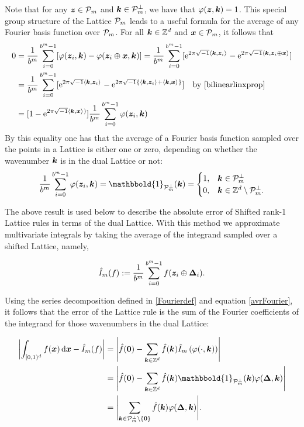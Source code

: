 \documentclass[graybox]{svmult}
\newcommand{\Z}{\mathbb{Z}} %
\newcommand{\bszero}{\boldsymbol{0}} %
\newcommand{\bsx}{\boldsymbol{x}}    %
\newcommand{\bsz}{\boldsymbol{z}}    %
\newcommand{\bsDelta}{\boldsymbol{\Delta}}    %
\newcommand{\ind}{\mathbbold{1}}
\begin{document}
Note that for any $\bsz\in\cp_m$ and $\boldsymbol{k}\in\mathcal{P}_m^\perp$, we have that $\varphi(\bsz,\bsk)=1$. This special group structure of the Lattice $\mathcal{P}_m$ leads to a useful formula for the average of any Fourier basis function over $\mathcal{P}_m$. For all $\bsk \in \Z^d$ and $\bsx \in \cp_m$, it follows that
\begin{align*}
\nonumber
0 & = \frac{1}{b^m} \sum_{i=0}^{b^m-1} [\varphi(\bsz_i,\bsk) - \varphi(\bsz_i \oplus \bsx,\bsk)]
= \frac{1}{b^m} \sum_{i=0}^{b^m-1} [\E^{2 \pi \sqrt{-1} \ip{\bsk}{\bsz_i}} - \E^{2 \pi \sqrt{-1} \ip{\bsk}{\bsz_i \oplus \bsx}}]\\
\nonumber
& = \frac{1}{b^m} \sum_{i=0}^{b^m-1} [\E^{2 \pi \sqrt{-1} \ip{\bsk}{\bsz_i}} - \E^{2 \pi \sqrt{-1} \{\ip{\bsk}{\bsz_i}+\ip{\bsk}{\bsx}\}}] \quad \text{by } \eqref{bilinearlinxprop}\\
\label{sumeq}
& = [1 - \E^{2 \pi \sqrt{-1} \ip{\bsk}{\bsx})}] \frac{1}{b^m} \sum_{i=0}^{b^m-1} \varphi(\bsz_i,\bsk)
\end{align*}
By this equality one has that the average of a Fourier basis function sampled over the points in a Lattice is either one or zero, depending on whether the wavenumber $\boldsymbol{k}$ is in the dual Lattice or not:
\begin{equation}\label{avrFourier}
\frac{1}{b^m} \sum_{i=0}^{b^m-1} \varphi(\bsz_i,\bsk) = \ind_{\cp_m^{\perp}}(\bsk) = \begin{cases} 1 , & \bsk \in \cp_m^{\perp}\\
 0,  & \bsk \in \Z^d \setminus \cp_m^{\perp}.
 \end{cases}
\end{equation}

The above result is used below to describe the absolute error of Shifted rank-1 Lattice rules in terms of the dual Lattice. With this method we approximate multivariate integrals by taking the average of the integrand sampled over a shifted Lattice, namely,

\begin{equation} \label{cubaturedef}
\hI_m(f) := \frac{1}{b^m} \sum_{i=0}^{b^m-1} f(\bsz_i \oplus\bsDelta_i).
\end{equation}

Using the series decomposition defined in \eqref{Fourierdef} and equation \eqref{avrFourier}, it follows that the error of the Lattice rule is the sum of the Fourier coefficients of the integrand for those wavenumbers in the dual Lattice:

\begin{align}
\nonumber
\biggabs{ \int_{\cube} f(\bsx) \, \D \bsx - \hI_m(f)} 
& = \Biggabs {\hf(\bszero) - \sum_{\bsk \in \Z^d} \hf(\bsk) \hI_m\left(\varphi(\cdot,\bsk)\right)} \\
\nonumber
& = \Biggabs {\hf(\bszero) - \sum_{\bsk \in \Z^d} \hf(\bsk) \ind_{\cp_m^{\perp}}(\bsk) \varphi(\bsDelta,\bsk)} \\ 
& = \Biggabs {\sum_{\bsk \in \cp_m^{\perp}\setminus \{\bszero\} } \hf(\bsk)  \varphi(\bsDelta,\bsk)}. \label{err1}
\end{align}
\end{document}
